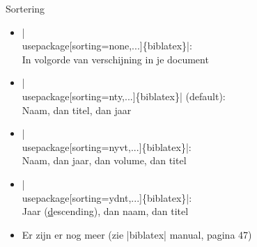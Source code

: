 
\begin{frame}{Sortering}
	\begin{itemize}[label=\textbullet]
		\item \hll|\\usepackage[sorting=none,...]\{biblatex\}|: \\
		In volgorde van verschijning in je document

		\item \hll|\\usepackage[sorting=nty,...]\{biblatex\}| (default):\\
		Naam, dan titel, dan jaar

		\item \hll|\\usepackage[sorting=nyvt,...]\{biblatex\}|:\\
		Naam, dan jaar, dan volume, dan titel

		\item \hll|\\usepackage[sorting=ydnt,...]\{biblatex\}|:\\
		Jaar (\underline{d}escending), dan naam, dan titel

		\item Er zijn er nog meer (zie \hll|biblatex| manual, pagina 47)
	\end{itemize}
\end{frame}
